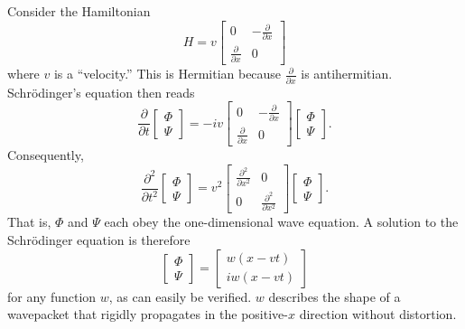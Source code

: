 \documentclass[11pt]{article}
\begin{document}
Consider the Hamiltonian
\begin{equation}
H = v \left[ \begin{array}{cc}
0 & - \frac{\partial}{\partial x} \\
\frac{\partial}{\partial x} & 0 \end{array} \right]
\end{equation}
where $v$ is a ``velocity.'' This is Hermitian because $\frac{\partial}{\partial x}$ is antihermitian. Schr{\"o}dinger's equation then reads
\begin{equation}
\frac{\partial}{\partial t} \left[ \begin{array}{c} \Phi \\ \Psi \end{array} \right] = -i v \left[ \begin{array}{cc} 0 & - \frac{\partial}{\partial x} \\ \frac{\partial}{\partial x} & 0 \end{array} \right] \left[ \begin{array}{c} \Phi \\ \Psi \end{array} \right].
\end{equation}
Consequently,
\begin{equation}
\frac{\partial^2}{\partial t^2} \left[ \begin{array}{c} \Phi \\ \Psi \end{array} \right] = v^2 \left[ \begin{array}{cc} \frac{\partial^2}{\partial x^2} & 0 \\ 0 & \frac{\partial^2}{\partial x^2} \end{array} \right] \left[ \begin{array}{c} \Phi \\ \Psi \end{array} \right].
\end{equation}
That is, $\Phi$ and $\Psi$ each obey the one-dimensional wave equation. A solution to the Schr{\"o}dinger equation is therefore
\begin{equation}
\left[ \begin{array}{c} \Phi \\ \Psi \end{array} \right] = \left[ \begin{array}{cc} w(x-vt) \\ iw(x-vt) \end{array} \right]
\end{equation}
for any function $w$, as can easily be verified. $w$ describes the shape of a wavepacket that rigidly propagates in the positive-$x$ direction without distortion.
\end{document}
